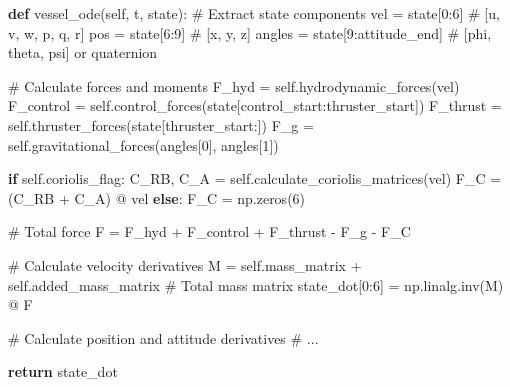 \documentclass[
  letterpaper,
  DIV=11,
  numbers=noendperiod]{scrreprt}
\newenvironment{Shaded}{\begin{snugshade}}{\end{snugshade}}
\newcommand{\CommentTok}[1]{\textcolor[rgb]{0.37,0.37,0.37}{#1}}
\newcommand{\ControlFlowTok}[1]{\textcolor[rgb]{0.00,0.23,0.31}{\textbf{#1}}}
\newcommand{\DecValTok}[1]{\textcolor[rgb]{0.68,0.00,0.00}{#1}}
\newcommand{\KeywordTok}[1]{\textcolor[rgb]{0.00,0.23,0.31}{\textbf{#1}}}
\newcommand{\NormalTok}[1]{\textcolor[rgb]{0.00,0.23,0.31}{#1}}
\newcommand{\OperatorTok}[1]{\textcolor[rgb]{0.37,0.37,0.37}{#1}}
\newcommand{\VariableTok}[1]{\textcolor[rgb]{0.07,0.07,0.07}{#1}}
\begin{document}
\begin{Shaded}
\begin{Highlighting}[]
\KeywordTok{def}\NormalTok{ vessel\_ode(}\VariableTok{self}\NormalTok{, t, state):}
    \CommentTok{\# Extract state components}
\NormalTok{    vel }\OperatorTok{=}\NormalTok{ state[}\DecValTok{0}\NormalTok{:}\DecValTok{6}\NormalTok{]  }\CommentTok{\# [u, v, w, p, q, r]}
\NormalTok{    pos }\OperatorTok{=}\NormalTok{ state[}\DecValTok{6}\NormalTok{:}\DecValTok{9}\NormalTok{]  }\CommentTok{\# [x, y, z]}
\NormalTok{    angles }\OperatorTok{=}\NormalTok{ state[}\DecValTok{9}\NormalTok{:attitude\_end]  }\CommentTok{\# [phi, theta, psi] or quaternion}
    
    \CommentTok{\# Calculate forces and moments}
\NormalTok{    F\_hyd }\OperatorTok{=} \VariableTok{self}\NormalTok{.hydrodynamic\_forces(vel)}
\NormalTok{    F\_control }\OperatorTok{=} \VariableTok{self}\NormalTok{.control\_forces(state[control\_start:thruster\_start])}
\NormalTok{    F\_thrust }\OperatorTok{=} \VariableTok{self}\NormalTok{.thruster\_forces(state[thruster\_start:])}
\NormalTok{    F\_g }\OperatorTok{=} \VariableTok{self}\NormalTok{.gravitational\_forces(angles[}\DecValTok{0}\NormalTok{], angles[}\DecValTok{1}\NormalTok{])}
    
    \ControlFlowTok{if} \VariableTok{self}\NormalTok{.coriolis\_flag:}
\NormalTok{        C\_RB, C\_A }\OperatorTok{=} \VariableTok{self}\NormalTok{.calculate\_coriolis\_matrices(vel)}
\NormalTok{        F\_C }\OperatorTok{=}\NormalTok{ (C\_RB }\OperatorTok{+}\NormalTok{ C\_A) }\OperatorTok{@}\NormalTok{ vel}
    \ControlFlowTok{else}\NormalTok{:}
\NormalTok{        F\_C }\OperatorTok{=}\NormalTok{ np.zeros(}\DecValTok{6}\NormalTok{)}
    
    \CommentTok{\# Total force}
\NormalTok{    F }\OperatorTok{=}\NormalTok{ F\_hyd }\OperatorTok{+}\NormalTok{ F\_control }\OperatorTok{+}\NormalTok{ F\_thrust }\OperatorTok{{-}}\NormalTok{ F\_g }\OperatorTok{{-}}\NormalTok{ F\_C}
    
    \CommentTok{\# Calculate velocity derivatives}
\NormalTok{    M }\OperatorTok{=} \VariableTok{self}\NormalTok{.mass\_matrix }\OperatorTok{+} \VariableTok{self}\NormalTok{.added\_mass\_matrix  }\CommentTok{\# Total mass matrix}
\NormalTok{    state\_dot[}\DecValTok{0}\NormalTok{:}\DecValTok{6}\NormalTok{] }\OperatorTok{=}\NormalTok{ np.linalg.inv(M) }\OperatorTok{@}\NormalTok{ F}
    
    \CommentTok{\# Calculate position and attitude derivatives}
    \CommentTok{\# ...}
    
    \ControlFlowTok{return}\NormalTok{ state\_dot}
\end{Highlighting}
\end{Shaded}
\end{document}
